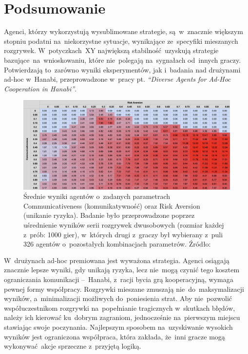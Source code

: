\documentclass[declaration,shortabstract,inz]{iithesis}
\begin{document}
\section{Podsumowanie}

Agenci, którzy wykorzystują wysublimowane strategie, są~w~znacznie większym stopniu podatni na~niekorzystne sytuacje, wynikające ze~specyfiki mieszanych rozgrywek. W~potyczkach~XY największą stabilność uzyskują strategie bazujące na~wnioskowaniu, które nie~polegają na~sygnałach od~innych graczy. Potwierdzają to~zarówno wyniki eksperymentów, jak i~badania nad drużynami ad-hoc w~Hanabi, przeprowadzone w~pracy pt. \textit{``Diverse Agents for Ad-Hoc Cooperation in Hanabi''}\cite{AdHoc}.

\bigskip

\begin{figure}[H]
	\centering
	\captionsetup{format=hang}
	\includegraphics[width=\textwidth,height=\textheight,keepaspectratio]{ad-hoc.png}
	\caption[Caption]{Średnie wyniki agentów o~zadanych parametrach Communicativeness (komunikatywność) oraz Risk Aversion (unikanie ryzyka). Badanie było przeprowadzone poprzez uśrednienie wyników serii rozgrywek dwusobowych (rozmiar każdej z~prób: 1000 gier), w~których drugi z~graczy był wybierany z~puli 326 agentów o~pozostałych kombinacjach parametrów. Źródło: \cite{AdHoc}}
	\label{fig:ad-hoc}
\end{figure}

W~drużynach ad-hoc premiowana jest wyważona strategia. Agenci osiągają znacznie lepsze wyniki, gdy unikają ryzyka, lecz nie~mogą czynić tego kosztem ograniczania komunikacji --~Hanabi, z~racji bycia grą kooperacyjną, wymaga pewnej formy współpracy. Rozgrywki mieszane zmuszają nie~do~maksymalizacji wyników, a~minimalizacji możliwych do~poniesienia strat. Aby nie~pozwolić współuczestnikom rozgrywki na~popełnianie tragicznych w~skutkach błędów, należy ich kierować ku~dobrym zagraniom, jednocześnie na~pierwszym miejscu stawiając swoje poczynania. Najlepszym sposobem na~uzyskiwanie wysokich wyników jest ograniczona współpraca, która zakłada, że~inni gracze mogą wykonywać akcje sprzeczne z~przyjętą logiką.
\end{document}
